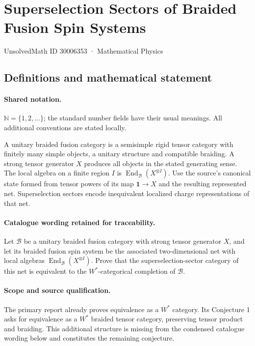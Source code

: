 \documentclass[11pt]{article}
\begin{document}
\setcounter{section}{30006352}
\section{Superselection Sectors of Braided Fusion Spin Systems}\label{30006353}
{\small UnsolvedMath ID 30006353 · Mathematical Physics}
\subsection{Definitions and mathematical statement}

\paragraph{Shared notation.}$\mathbb N=\{1,2,\ldots\}$; the standard number fields have their usual meanings. All additional conventions are stated locally.


A unitary braided fusion category is a semisimple rigid tensor category with finitely many simple objects, a unitary structure and compatible braiding. A strong tensor generator $X$ produces all objects in the stated generating sense. The local algebra on a finite region $I$ is $\operatorname{End}_{\mathcal B}(X^{\otimes I})$. Use the source's canonical state formed from tensor powers of its map $\mathbf1\to X$ and the resulting represented net. Superselection sectors encode inequivalent localized charge representations of that net.

\paragraph{Catalogue wording retained for traceability.}
Let $\mathcal{B}$ be a unitary braided fusion category with strong tensor generator $X$, and let its braided fusion spin system be the associated two-dimensional net with local algebras $\operatorname{End}_{\mathcal{B}}(X^{\otimes I})$. Prove that the superselection-sector category of this net is equivalent to the $W^*$-categorical completion of $\mathcal{B}$.

\paragraph{Scope and source qualification.}The primary report already proves equivalence as a $W^*$ category. Its Conjecture 1 asks for equivalence as a $W^*$ braided tensor category, preserving tensor product and braiding. This additional structure is missing from the condensed catalogue wording below and constitutes the remaining conjecture.
\end{document}
